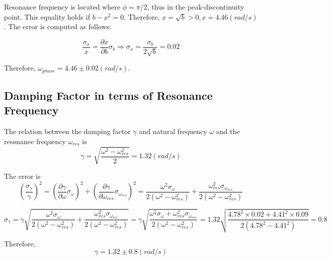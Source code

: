 Resonance frequency is located where $\phi = \pi/2$, thus in the peak-discontinuity point. This equality holds if $b-x^2=0$. Therefore, $x = \sqrt{b} > 0, x = 4.46 (rad/s)$. The error is computed as follows:

\begin{equation*}
  \frac{\sigma_x}{x} = \frac{\partial x}{\partial b} \sigma_b \Rightarrow \sigma_x = \frac{\sigma_b}{2\sqrt{b}} = 0.02
\end{equation*}

Therefore, $\omega_{phase} = 4.46 \pm 0.02 (rad/s)$.

\subsection{Damping Factor in terms of Resonance Frequency}

The relation between the damping factor $\gamma$ and natural frequency $\omega$ and the resonance frequency $\omega_{res}$ is
\begin{equation*}
  \gamma = \sqrt{\frac{\omega^2 - \omega_{res}^2}{2}} = 1.32 (rad/s)
\end{equation*}

The error is
\begin{equation*}
  \left( \frac{\sigma_\gamma}{\gamma} \right)^2 = \left( \frac{\partial \gamma}{\partial \omega} \sigma_\omega \right)^2 + \left( \frac{\partial \gamma}{\partial \omega_{res}} \sigma_{\omega_{res}} \right)^2 = \frac{\omega^2 \sigma_{\omega}}{2(\omega^2 - \omega_{res}^2)} + \frac{\omega_{res}^2\sigma_{\omega_{res}}}{2(\omega^2 - \omega_{res}^2)}
\end{equation*}

\begin{equation*}
  \sigma_\gamma = \gamma \sqrt{\frac{\omega^2 \sigma_{\omega}}{2(\omega^2 - \omega_{res}^2)} + \frac{\omega_{res}^2\sigma_{\omega_{res}}}{2(\omega^2 - \omega_{res}^2)}} = \gamma \sqrt{\frac{\omega^2 \sigma_\omega + \omega_{res}^2 \sigma_{\omega_{res}}}{2(\omega^2 - \omega_{res}^2)}} = 1.32 \sqrt{ \frac{4.78^2 \times 0.02 + 4.41^2 \times 0.09}{2(4.78^2 - 4.41^2)} } = 0.8
\end{equation*}

Therefore,
\begin{equation*}
  \gamma = 1.32 \pm 0.8 (rad/s) 
\end{equation*}
